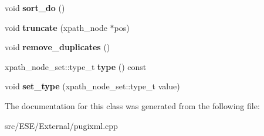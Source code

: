 \begin{DoxyCompactItemize}
\item 
\hypertarget{classxpath__node__set__raw_a5e46ee306afc24ea83f6c1181bba3600}{void {\bfseries sort\-\_\-do} ()}\label{classxpath__node__set__raw_a5e46ee306afc24ea83f6c1181bba3600}

\item 
\hypertarget{classxpath__node__set__raw_aba48d228f554065702f3e6d5059f701d}{void {\bfseries truncate} (xpath\-\_\-node $\ast$pos)}\label{classxpath__node__set__raw_aba48d228f554065702f3e6d5059f701d}

\item 
\hypertarget{classxpath__node__set__raw_af82da6fa8d42f9dff9c55e7b93d96e26}{void {\bfseries remove\-\_\-duplicates} ()}\label{classxpath__node__set__raw_af82da6fa8d42f9dff9c55e7b93d96e26}

\item 
\hypertarget{classxpath__node__set__raw_a9c1dceb2d9a8e0747380bd12968fc9d8}{xpath\-\_\-node\-\_\-set\-::type\-\_\-t {\bfseries type} () const }\label{classxpath__node__set__raw_a9c1dceb2d9a8e0747380bd12968fc9d8}

\item 
\hypertarget{classxpath__node__set__raw_ae73780271d772967f78ddd7b9376cdab}{void {\bfseries set\-\_\-type} (xpath\-\_\-node\-\_\-set\-::type\-\_\-t value)}\label{classxpath__node__set__raw_ae73780271d772967f78ddd7b9376cdab}

\end{DoxyCompactItemize}


The documentation for this class was generated from the following file\-:\begin{DoxyCompactItemize}
\item 
src/\-E\-S\-E/\-External/pugixml.\-cpp\end{DoxyCompactItemize}
